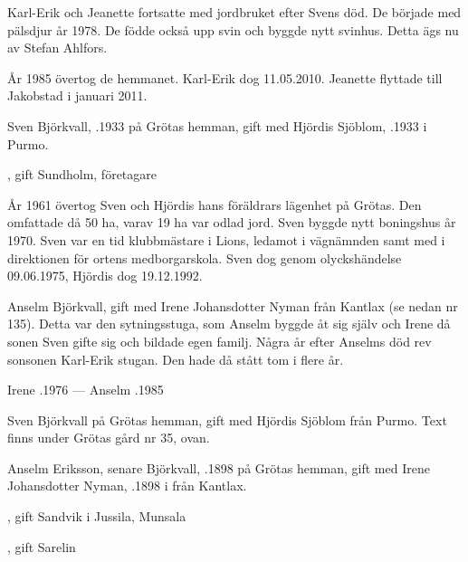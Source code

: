 Karl-Erik och Jeanette fortsatte med  jordbruket efter Svens död. De började med pälsdjur år 1978. De födde också upp svin och byggde nytt svinhus. Detta ägs nu av Stefan Ahlfors.

År 1985 övertog de hemmanet. Karl-Erik dog 11.05.2010. Jeanette flyttade till Jakobstad i januari 2011.


Sven Björkvall, .1933 på Grötas hemman, gift med Hjördis Sjöblom, .1933 i Purmo.
\begin{jhchildren}
  \item {}
  \item {}, gift Sundholm, företagare
\end{jhchildren}

År 1961 övertog Sven och Hjördis hans föräldrars lägenhet på Grötas. Den omfattade då 50 ha, varav 19 ha var odlad jord. Sven byggde nytt boningshus år 1970. Sven var en tid klubbmästare i Lions, ledamot i vägnämnden samt med i direktionen för ortens medborgarskola. Sven dog genom olyckshändelse 09.06.1975, Hjördis dog 19.12.1992.





Anselm  Björkvall,  gift med Irene Johansdotter Nyman från Kantlax (se nedan nr 135).
Detta var den sytningsstuga, som Anselm byggde åt sig själv och Irene då sonen Sven gifte sig och bildade egen familj. Några år efter Anselms död rev sonsonen Karl-Erik stugan. Den hade då stått tom i flere år.

Irene .1976  ---  Anselm .1985





Sven Björkvall på Grötas hemman, gift med Hjördis Sjöblom från Purmo. Text finns under Grötas gård nr 35, ovan.


Anselm Eriksson, senare Björkvall, .1898 på Grötas hemman, gift med Irene Johansdotter Nyman, .1898 i från Kantlax.
\begin{jhchildren}
  \item {}
  \item {}, gift Sandvik i Jussila, Munsala
  \item {}, gift Sarelin
  \item {}
\end{jhchildren}

